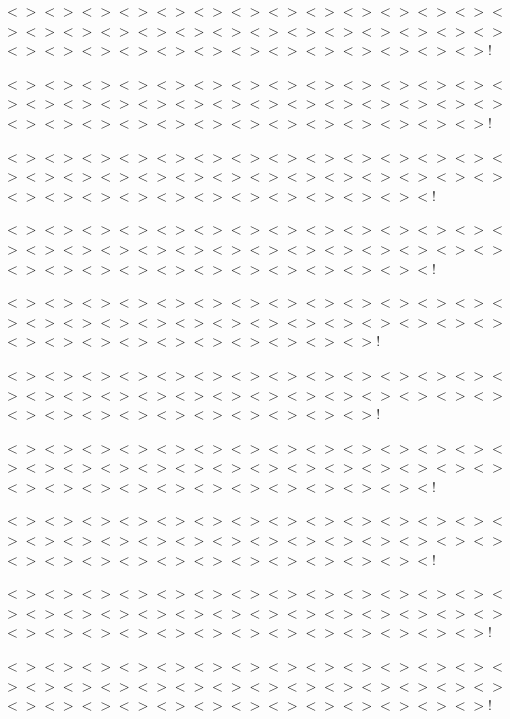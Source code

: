 $<$$>$$<$$>$$<$$>$$<$$>$$<$$>$$<$$>$$<$$>$$<$$>$$<$$>$$<$$>$$<$$>$$<$$>$$<$$>$$<$$>$$<$$>$$<$$>$$<$$>$$<$$>$$<$$>$$<$$>$$<$$>$$<$$>$$<$$>$$<$$>$$<$$>$$<$$>$$<$$>$$<$$>$$<$$>$$<$$>$$<$$>$$<$$>$$<$$>$$<$$>$$<$$>$$<$$>$$<$$>$$<$$>$$<$$>$$<$$>$!

$<$$>$$<$$>$$<$$>$$<$$>$$<$$>$$<$$>$$<$$>$$<$$>$$<$$>$$<$$>$$<$$>$$<$$>$$<$$>$$<$$>$$<$$>$$<$$>$$<$$>$$<$$>$$<$$>$$<$$>$$<$$>$$<$$>$$<$$>$$<$$>$$<$$>$$<$$>$$<$$>$$<$$>$$<$$>$$<$$>$$<$$>$$<$$>$$<$$>$$<$$>$$<$$>$$<$$>$$<$$>$$<$$>$$<$$>$$<$$>$!

$<$$>$$<$$>$$<$$>$$<$$>$$<$$>$$<$$>$$<$$>$$<$$>$$<$$>$$<$$>$$<$$>$$<$$>$$<$$>$$<$$>$$<$$>$$<$$>$$<$$>$$<$$>$$<$$>$$<$$>$$<$$>$$<$$>$$<$$>$$<$$>$$<$$>$$<$$>$$<$$>$$<$$>$$<$$>$$<$$>$$<$$>$$<$$>$$<$$>$$<$$>$$<$$>$$<$$>$$<$$>$$<$$>$$<$!

$<$$>$$<$$>$$<$$>$$<$$>$$<$$>$$<$$>$$<$$>$$<$$>$$<$$>$$<$$>$$<$$>$$<$$>$$<$$>$$<$$>$$<$$>$$<$$>$$<$$>$$<$$>$$<$$>$$<$$>$$<$$>$$<$$>$$<$$>$$<$$>$$<$$>$$<$$>$$<$$>$$<$$>$$<$$>$$<$$>$$<$$>$$<$$>$$<$$>$$<$$>$$<$$>$$<$$>$$<$$>$$<$$>$$<$!

$<$$>$$<$$>$$<$$>$$<$$>$$<$$>$$<$$>$$<$$>$$<$$>$$<$$>$$<$$>$$<$$>$$<$$>$$<$$>$$<$$>$$<$$>$$<$$>$$<$$>$$<$$>$$<$$>$$<$$>$$<$$>$$<$$>$$<$$>$$<$$>$$<$$>$$<$$>$$<$$>$$<$$>$$<$$>$$<$$>$$<$$>$$<$$>$$<$$>$$<$$>$$<$$>$$<$$>$$<$$>$!

$<$$>$$<$$>$$<$$>$$<$$>$$<$$>$$<$$>$$<$$>$$<$$>$$<$$>$$<$$>$$<$$>$$<$$>$$<$$>$$<$$>$$<$$>$$<$$>$$<$$>$$<$$>$$<$$>$$<$$>$$<$$>$$<$$>$$<$$>$$<$$>$$<$$>$$<$$>$$<$$>$$<$$>$$<$$>$$<$$>$$<$$>$$<$$>$$<$$>$$<$$>$$<$$>$$<$$>$$<$$>$!

$<$$>$$<$$>$$<$$>$$<$$>$$<$$>$$<$$>$$<$$>$$<$$>$$<$$>$$<$$>$$<$$>$$<$$>$$<$$>$$<$$>$$<$$>$$<$$>$$<$$>$$<$$>$$<$$>$$<$$>$$<$$>$$<$$>$$<$$>$$<$$>$$<$$>$$<$$>$$<$$>$$<$$>$$<$$>$$<$$>$$<$$>$$<$$>$$<$$>$$<$$>$$<$$>$$<$$>$$<$$>$$<$$>$$<$!

$<$$>$$<$$>$$<$$>$$<$$>$$<$$>$$<$$>$$<$$>$$<$$>$$<$$>$$<$$>$$<$$>$$<$$>$$<$$>$$<$$>$$<$$>$$<$$>$$<$$>$$<$$>$$<$$>$$<$$>$$<$$>$$<$$>$$<$$>$$<$$>$$<$$>$$<$$>$$<$$>$$<$$>$$<$$>$$<$$>$$<$$>$$<$$>$$<$$>$$<$$>$$<$$>$$<$$>$$<$$>$$<$$>$$<$!

$<$$>$$<$$>$$<$$>$$<$$>$$<$$>$$<$$>$$<$$>$$<$$>$$<$$>$$<$$>$$<$$>$$<$$>$$<$$>$$<$$>$$<$$>$$<$$>$$<$$>$$<$$>$$<$$>$$<$$>$$<$$>$$<$$>$$<$$>$$<$$>$$<$$>$$<$$>$$<$$>$$<$$>$$<$$>$$<$$>$$<$$>$$<$$>$$<$$>$$<$$>$$<$$>$$<$$>$$<$$>$$<$$>$$<$$>$$<$$>$!

$<$$>$$<$$>$$<$$>$$<$$>$$<$$>$$<$$>$$<$$>$$<$$>$$<$$>$$<$$>$$<$$>$$<$$>$$<$$>$$<$$>$$<$$>$$<$$>$$<$$>$$<$$>$$<$$>$$<$$>$$<$$>$$<$$>$$<$$>$$<$$>$$<$$>$$<$$>$$<$$>$$<$$>$$<$$>$$<$$>$$<$$>$$<$$>$$<$$>$$<$$>$$<$$>$$<$$>$$<$$>$$<$$>$$<$$>$$<$$>$! 

